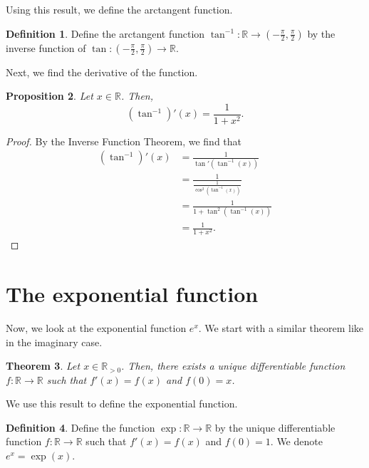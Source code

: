 \documentclass[a4paper, openany]{memoir}
\theoremstyle{definition}
\newtheorem{definition}{Definition}[section]
\theoremstyle{plain}
\newtheorem{theorem}[definition]{Theorem}
\newtheorem{proposition}[definition]{Proposition}
\begin{document}
\noindent Using this result, we define the arctangent function.
\begin{definition}
Define the arctangent function $\tan^{-1}: \mathbb{R} \to (-\frac{\pi}{2}, \frac{\pi}{2})$ by the inverse function of $\tan: (-\frac{\pi}{2}, \frac{\pi}{2}) \to \mathbb{R}$.
\end{definition}
\noindent Next, we find the derivative of the function.
\begin{proposition}
Let $x \in \mathbb{R}$. Then,
\[(\tan^{-1})'(x) = \frac{1}{1 + x^2}.\]
\end{proposition}
\begin{proof}
By the Inverse Function Theorem, we find that
\begin{align*}
    (\tan^{-1})'(x) &= \frac{1}{\tan'(\tan^{-1}(x))} \\
    &= \frac{1}{\frac{1}{\cos^2(\tan^{-1}(x))}} \\
    &= \frac{1}{1 + \tan^2(\tan^{-1}(x))} \\
    &= \frac{1}{1 + x^2}.
\end{align*}
\end{proof}

\newpage

\section{The exponential function}
Now, we look at the exponential function $e^x$. We start with a similar theorem like in the imaginary case.
\begin{theorem}
Let $x \in \mathbb{R}_{> 0}$. Then, there exists a unique differentiable function $f: \mathbb{R} \to \mathbb{R}$ such that $f'(x) = f(x)$ and $f(0) = x$.
\end{theorem}
\noindent We use this result to define the exponential function.
\begin{definition}
Define the function $\exp: \mathbb{R} \to \mathbb{R}$ by the unique differentiable function $f: \mathbb{R} \to \mathbb{R}$ such that $f'(x) = f(x)$ and $f(0) = 1$. We denote $e^x = \exp(x)$.
\end{definition}
\end{document}
